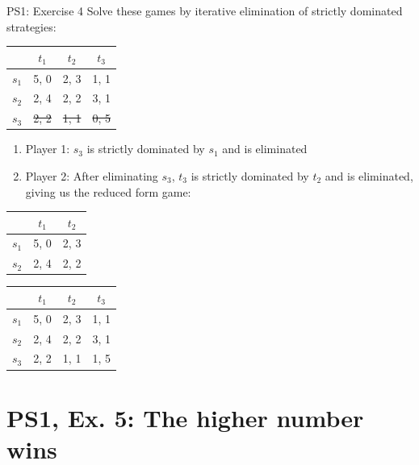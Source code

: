 \begin{frame}{PS1: Exercise 4}
Solve these games by iterative elimination of strictly dominated strategies:
\begin{multicols}{2}
\begin{table}
  \begin{tabular}{c|c|c|c}
          & $t_1$ & $t_2$ & $t_3$ \\
    \midrule
    $s_1$ & 5, 0  & 2, 3  & 1, 1 \\
    \midrule
    $s_2$ & 2, 4  & 2, 2  & 3, 1 \\
    \midrule
    \sout{$s_3$} & \sout{2, 2}  & \sout{1, 1}  & \sout{0, 5}
  \end{tabular}
\end{table}
\begin{enumerate}
  \item Player 1: $s_3$ is strictly dominated by $s_1$ and is eliminated
  \item Player 2: After eliminating $s_3$, $t_3$ is strictly dominated by $t_2$ and is eliminated, giving us the reduced form game:
\end{enumerate}
\begin{table}
  \begin{tabular}{c|c|c}
          & $t_1$ & $t_2$ \\
    \midrule
    $s_1$ & 5, 0  & 2, 3  \\
    \midrule
    $s_2$ & 2, 4  & 2, 2  \\
  \end{tabular}
\end{table}
\vfill\null \columnbreak
\begin{table}
  \begin{tabular}{c|c|c|c}
          & $t_1$ & $t_2$ & $t_3$ \\
    \midrule
    $s_1$ & 5, 0  & 2, 3  & 1, 1 \\
    \midrule
    $s_2$ & 2, 4  & 2, 2  & 3, 1 \\
    \midrule
    $s_3$ & 2, 2  & 1, 1  & 1, 5
  \end{tabular}
\end{table}
\vfill\null
\end{multicols}
\end{frame}


\section{PS1, Ex. 5: The higher number wins}


